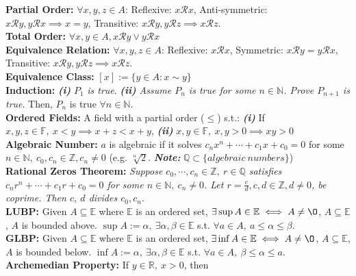 \documentclass{letter}
\begin{document}
\textbf{Partial Order:}
$\forall x, y, z \in A$: Reflexive: $x \mathcal{R} x$, Anti-symmetric:
$x \mathcal{R} y, y \mathcal{R} x \implies x = y$, Transitive: $x \mathcal{R} y, y
\mathcal{R} z \implies x \mathcal{R} z$. \\
\textbf{Total Order:} $\forall x, y \in A, x \mathcal{R} y \lor y \mathcal{R} x$ \\
\textbf{Equivalence Relation:}
$\forall x, y, z \in A$: Reflexive: $x \mathcal{R} x$, Symmetric:
$x \mathcal{R} y = y \mathcal{R} x$, Transitive: $x \mathcal{R} y, y
\mathcal{R} z \implies x \mathcal{R} z$. \\
\textbf{Equivalence Class:} $[x] := \{y \in A : x \sim y\}$ \\
\textbf{Induction:} \textit{\textbf{(i)}} $P_1$ \textit{is
  true}. \textit{\textbf{(ii)} Assume $P_n$ is true
  for some $n \in \mathbb{N}$. Prove $P_{n + 1}$ is true}. Then, $P_n$
is true $\forall n \in \mathbb{N}$. \\
\textbf{Ordered Fields:} A field with a partial order ($\leq$) s.t.:
\textit{\textbf{(i)}} If $x, y , z \in \mathbb{F}, \ x < y \implies x + z < x + y$,
\textit{\textbf{(ii)}} $x, y \in \mathbb{F}, \ x, y > 0 \implies xy > 0$ \\
\textbf{Algebraic Number:} $a$ is algebraic if it solves $c_nx^n +
\cdots + c_1x + c_0 = 0$ for some $n \in \mathbb{N}, \ c_0, c_n \in
\mathbb{Z}, c_n \neq 0$ (e.g. $\sqrt[n]{2}$. \textit{\textbf{Note:}}
$\mathbb{Q} \subset \{algebraic \ numbers\}$) \\ 
\textbf{Rational Zeros Theorem:} \textit{Suppose $c_0, \cdots, c_n \in
  \mathbb{Z}, \ r \in \mathbb{Q}$ satisfies $c_nr^n + \cdots + c_1r +
  c_0 = 0$ for some $n \in \mathbb{N}, \ c_n \neq 0$. Let $r =
  \frac{c}{d}, c, d \in \mathbb{Z}, d \neq 0$, be coprime. Then $c, \ d$
  divides $c_0, c_n$}. \\
\textbf{LUBP:}
Given $A \subseteq \mathbb{E}$ where $\mathbb{E}$ is an ordered set,
$\exists \sup{A} \in \mathbb{E} \iff A \neq \O$, $A \subseteq
\mathbb{E}$, $A$ is bounded above. $\sup{A} := \alpha, \ \exists \alpha, \beta \in
\mathbb{E}$ s.t. $\forall a \in A, \ a \leq \alpha \leq \beta$. \\
\textbf{GLBP:}
Given $A \subseteq \mathbb{E}$ where $\mathbb{E}$ is an ordered set,
$\exists \inf{A} \in \mathbb{E} \iff A \neq \O$, $A \subseteq
\mathbb{E}$, $A$ is bounded below. $\inf{A} := \alpha, \ \exists \alpha, \beta \in
\mathbb{E}$ s.t. $\forall a \in A, \ \beta \leq \alpha \leq a$. \\
\textbf{Archemedian Property:} If $y \in \mathbb{R}, \ x > 0$, then
\end{document}

